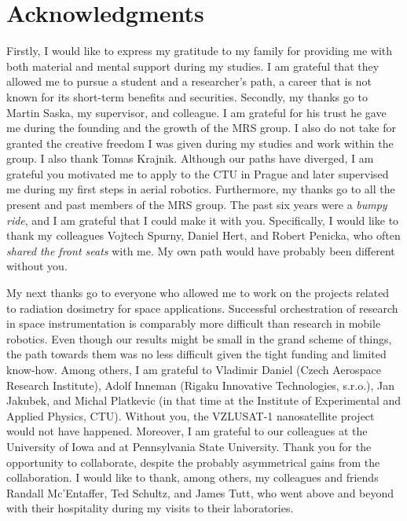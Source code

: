 
\section*{Acknowledgments}

Firstly, I would like to express my gratitude to my family for providing me with both material and mental support during my studies.
I am grateful that they allowed me to pursue a student and a researcher's path, a career that is not known for its short-term benefits and securities.
Secondly, my thanks go to Martin Saska, my supervisor, and colleague.
I am grateful for his trust he gave me during the founding and the growth of the MRS group.
I also do not take for granted the creative freedom I was given during my studies and work within the group.
I also thank Tomas Krajnik.
Although our paths have diverged, I am grateful you motivated me to apply to the CTU in Prague and later supervised me during my first steps in aerial robotics.
Furthermore, my thanks go to all the present and past members of the MRS group.
The past six years were a \emph{bumpy ride}, and I am grateful that I could make it with you.
Specifically, I would like to thank my colleagues Vojtech Spurny, Daniel Hert, and Robert Penicka, who often \emph{shared the front seats} with me.
My own path would have probably been different without you.

My next thanks go to everyone who allowed me to work on the projects related to radiation dosimetry for space applications.
Successful orchestration of research in space instrumentation is comparably more difficult than research in mobile robotics.
Even though our results might be small in the grand scheme of things, the path towards them was no less difficult given the tight funding and limited know-how.
Among others, I am grateful to Vladimir Daniel (Czech Aerospace Research Institute), Adolf Inneman (Rigaku Innovative Technologies, s.r.o.), Jan Jakubek, and Michal Platkevic (in that time at the Institute of Experimental and Applied Physics, CTU).
Without you, the VZLUSAT-1 nanosatellite project would not have happened.
Moreover, I am grateful to our colleagues at the University of Iowa and at Pennsylvania State University.
Thank you for the opportunity to collaborate, despite the probably asymmetrical gains from the collaboration.
I would like to thank, among others, my colleagues and friends Randall Mc'Entaffer, Ted Schultz, and James Tutt, who went above and beyond with their hospitality during my visits to their laboratories.

